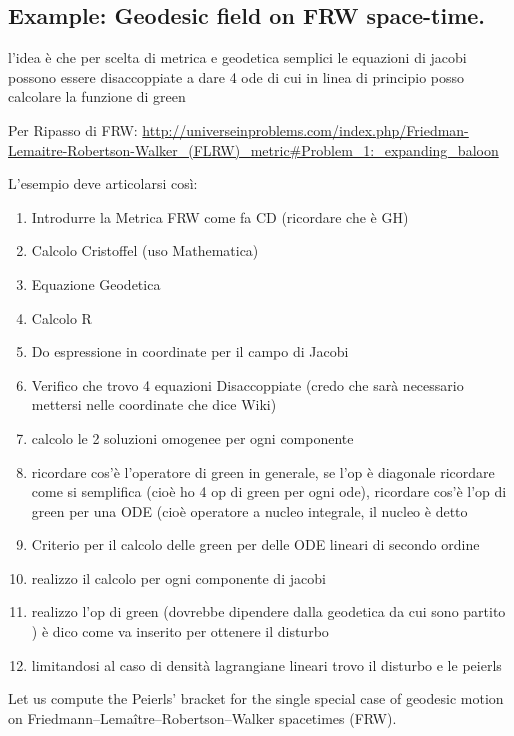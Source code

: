 \documentclass[Main]{subfiles}
\begin{document}
\subsection{Example: Geodesic field on FRW space-time.}
\ifToninus
	\begin{Warning}
	l'idea è che per scelta di metrica e geodetica semplici le equazioni di jacobi possono essere disaccoppiate a dare 4 ode di cui in linea di principio posso calcolare la funzione di green	

	\vspace{2mm}
	Per Ripasso di FRW: \url{http://universeinproblems.com/index.php/Friedman-Lemaitre-Robertson-Walker_(FLRW)_metric#Problem_1:_expanding_baloon}

	\vspace{2mm}
	L'esempio deve articolarsi così:
		\begin{enumerate}
			\item Introdurre la Metrica FRW come fa CD (ricordare che è GH)
			\item Calcolo Cristoffel (uso Mathematica)
			\item Equazione Geodetica
			\item Calcolo R
			\item Do espressione in coordinate per il campo di Jacobi
			\item Verifico che trovo 4 equazioni Disaccoppiate (credo che sarà necessario mettersi nelle coordinate che dice Wiki)
			\item calcolo le 2 soluzioni omogenee per ogni componente
			\item ricordare cos'è l'operatore di green in generale, se l'op è diagonale ricordare come si semplifica (cioè ho 4 op di green per ogni ode), ricordare cos'è l'op di green per una ODE (cioè operatore  a nucleo integrale, il nucleo è detto 
			\item Criterio per il calcolo delle green per delle ODE lineari di secondo ordine
			\item realizzo il calcolo per ogni componente di jacobi
			\item realizzo l'op di green (dovrebbe dipendere dalla geodetica da cui sono partito ) è dico come va inserito per ottenere il disturbo
			\item limitandosi al caso di densità lagrangiane lineari trovo il disturbo e le peierls
		\end{enumerate}
	\end{Warning}
\fi	
	Let us compute the Peierls' bracket for the single special case of geodesic motion on Friedmann–Lemaître–Robertson–Walker spacetimes (FRW).
	
\end{document}
